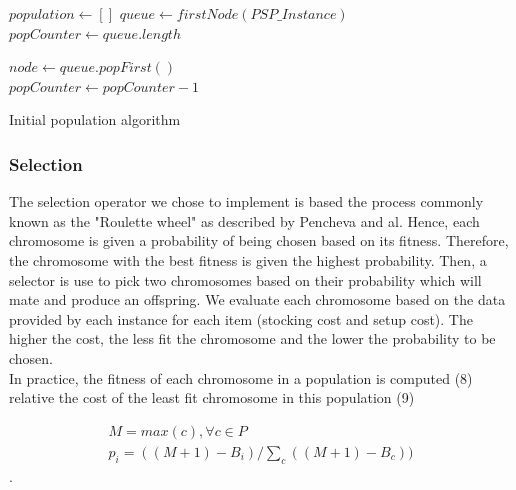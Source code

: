 \documentclass[twocolumn,10pt]{asme2ej}
\begin{document}
\begin{algorithm}[!ht]
\DontPrintSemicolon
    $population \gets []$ \;
    $queue \gets firstNode(PSP\_Instance) $ \;
    $popCounter \gets queue.length $ \;
    {
        $node \gets queue.popFirst()$ \\
        $popCounter \gets popCounter - 1 $ \\
        
    }

\caption{Initial population algorithm}
\label{algo:initialisation}
\end{algorithm}

\subsubsection{Selection}

The selection operator we chose to implement is based the process commonly known as the "Roulette wheel" as described by Pencheva and al\cite{rWheel_paper}. Hence, each chromosome is given a probability of being chosen based on its fitness. Therefore, the chromosome with the best fitness is given the highest probability. Then, a selector is use to pick two chromosomes based on their probability which will  mate and produce an offspring. 
We evaluate each chromosome based on the data provided by each instance for each item (stocking cost and setup cost). The higher the cost, the less fit the chromosome and the lower the probability to be chosen. \\
In practice, the fitness of each chromosome in a population is computed (8) relative the cost of the least fit chromosome in this population (9)

\begin{gather}
    M = max(c), \forall c \in P \\
    p_{i} = ((M + 1) - B_{i}) / \sum_{c} ((M + 1) - B_{c}) ) 
\end{gather}. 
\end{document}
